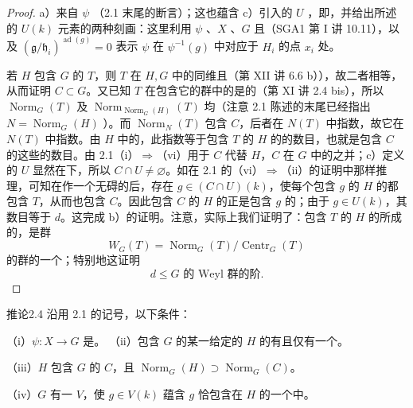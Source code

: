 \begin{proof}
a）来自 $\psi$ （2.1 末尾的断言）；这也蕴含 c）引入的 $U$ ，即，并给出所述的 $U(k)$ 元素的两种刻画：这里利用 $\psi$ 、$X$ 、$G$ 且（SGA1 第 I 讲 10.11），以及 $(\mathfrak g/\mathfrak h_i)^{\operatorname{ad}(g)}=0$ 表示 $\psi$ 在 $\psi^{-1}(g)$ 中对应于 $H_i$ 的点 $x_i$ 处。

若 $H$ 包含 $G$ 的 $T$，则 $T$ 在 $H,G$ 中的同维且（第 XII 讲 6.6 b）），故二者相等，从而证明 $C\subset G$。又已知 $T$ 在包含它的群中的是的（第 XI 讲 2.4 bis），所以 $\operatorname{Norm}_G(T)$ 及 $\operatorname{Norm}_{\operatorname{Norm}_G(H)}(T)$ 均（注意 2.1 陈述的末尾已经指出 $N=\operatorname{Norm}_G(H)$ ）。而 $\operatorname{Norm}_N(T)$ 包含 $C$，后者在 $N(T)$ 中指数，故它在 $N(T)$ 中指数。由 $H$ 中的，此指数等于包含 $T$ 的 $H$ 的的数目，也就是包含 $C$ 的这些的数目。由 2.1（i）$\Rightarrow$（vi）用于 $C$ 代替 $H$，$C$ 在 $G$ 中的之并；c）定义的 $U$ 显然在下，所以 $C\cap U\ne\varnothing$。如在 2.1 的（vi）$\Rightarrow$（ii）的证明中那样推理，可知在作一个无碍的后，存在 $g\in(C\cap U)(k)$，使每个包含 $g$ 的 $H$ 的都包含 $T$，从而也包含 $C$。因此包含 $C$ 的 $H$ 的正是包含 $g$ 的；由于 $g\in U(k)$，其数目等于 $d$。这完成 b）的证明。注意，实际上我们证明了：包含 $T$ 的 $H$ 的所成的，是群
\[W_G(T)=\operatorname{Norm}_G(T)/\operatorname{Centr}_G(T)\]
的群的一个；特别地这证明
\[d\leq G\text{ 的\ Weyl 群的阶}.\]
\end{proof}
\begin{SGAresult}{推论}{2.4}
沿用 2.1 的记号，以下条件：

（i）$\psi:X\to G$ 是。
（ii）包含 $G$ 的某一给定的 $H$ 的有且仅有一个。

（iii）$H$ 包含 $G$ 的 $C$，且 $\operatorname{Norm}_G(H)\supset\operatorname{Norm}_G(C)$。

（iv）$G$ 有一 $V$，使 $g\in V(k)$ 蕴含 $g$ 恰包含在 $H$ 的一个中。
\end{SGAresult}
